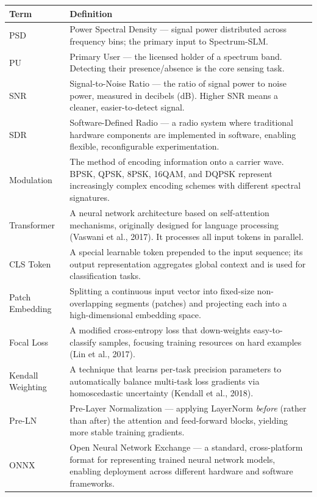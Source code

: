 \documentclass[12pt,a4paper]{article}
\begin{document}
\begin{longtable}{@{}p{3.2cm}p{10cm}@{}}
\toprule\textbf{Term}&\textbf{Definition}\\\midrule\endfirsthead\endhead
PSD & Power Spectral Density --- signal power distributed across frequency bins; the primary input to Spectrum-SLM.\\\midrule
PU & Primary User --- the licensed holder of a spectrum band. Detecting their presence/absence is the core sensing task.\\\midrule
SNR & Signal-to-Noise Ratio --- the ratio of signal power to noise power, measured in decibels (dB). Higher SNR means a cleaner, easier-to-detect signal.\\\midrule
SDR & Software-Defined Radio --- a radio system where traditional hardware components are implemented in software, enabling flexible, reconfigurable experimentation.\\\midrule
Modulation & The method of encoding information onto a carrier wave. BPSK, QPSK, 8PSK, 16QAM, and DQPSK represent increasingly complex encoding schemes with different spectral signatures.\\\midrule
Transformer & A neural network architecture based on self-attention mechanisms, originally designed for language processing (Vaswani et al., 2017). It processes all input tokens in parallel.\\\midrule
CLS Token & A special learnable token prepended to the input sequence; its output representation aggregates global context and is used for classification tasks.\\\midrule
Patch Embedding & Splitting a continuous input vector into fixed-size non-overlapping segments (patches) and projecting each into a high-dimensional embedding space.\\\midrule
Focal Loss & A modified cross-entropy loss that down-weights easy-to-classify samples, focusing training resources on hard examples (Lin et al., 2017).\\\midrule
Kendall Weighting & A technique that learns per-task precision parameters to automatically balance multi-task loss gradients via homoscedastic uncertainty (Kendall et al., 2018).\\\midrule
Pre-LN & Pre-Layer Normalization --- applying LayerNorm \textit{before} (rather than after) the attention and feed-forward blocks, yielding more stable training gradients.\\\midrule
ONNX & Open Neural Network Exchange --- a standard, cross-platform format for representing trained neural network models, enabling deployment across different hardware and software frameworks.\\\midrule

\end{longtable}
\end{document}
